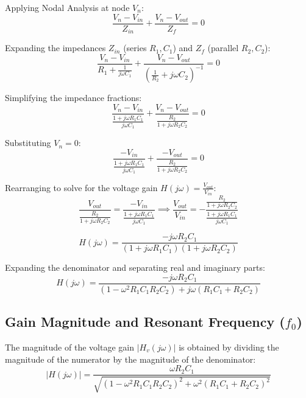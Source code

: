 \documentclass[12pt]{article}
\begin{document}
Applying Nodal Analysis at node $V_n$:
\begin{equation}
    \frac{V_n - V_{in}}{Z_{in}} + \frac{V_n - V_{out}}{Z_f} = 0
\end{equation}

Expanding the impedances $Z_{in}$ (series $R_1, C_1$) and $Z_f$ (parallel $R_2, C_2$):
\begin{equation}
    \frac{V_n - V_{in}}{R_1 + \frac{1}{j\omega C_1}} + \frac{V_n - V_{out}}{\left(\frac{1}{R_2} + j\omega C_2\right)^{-1}} = 0
\end{equation}

Simplifying the impedance fractions:
\begin{equation}
    \frac{V_n - V_{in}}{\frac{1 + j\omega R_1C_1}{j\omega C_1}} + \frac{V_n - V_{out}}{\frac{R_2}{1 + j\omega R_2C_2}} = 0
\end{equation}

Substituting $V_n = 0$:
\begin{equation}
    \frac{-V_{in}}{\frac{1 + j\omega R_1C_1}{j\omega C_1}} + \frac{-V_{out}}{\frac{R_2}{1 + j\omega R_2C_2}} = 0
\end{equation}

Rearranging to solve for the voltage gain $H(j\omega) = \frac{V_{out}}{V_{in}}$:
\begin{equation}
    \frac{V_{out}}{\frac{R_2}{1 + j\omega R_2C_2}} = \frac{-V_{in}}{\frac{1 + j\omega R_1C_1}{j\omega C_1}} \implies \frac{V_{out}}{V_{in}} = - \frac{\frac{R_2}{1 + j\omega R_2C_2}}{\frac{1 + j\omega R_1C_1}{j\omega C_1}}
\end{equation}

\begin{equation}
    H(j\omega) = \frac{-j\omega R_2C_1}{(1 + j\omega R_1C_1)(1 + j\omega R_2C_2)}
\end{equation}

Expanding the denominator and separating real and imaginary parts:
\begin{equation}
    H(j\omega) = \frac{-j\omega R_2C_1}{(1 - \omega^2 R_1C_1 R_2C_2) + j\omega(R_1C_1 + R_2C_2)}
\end{equation}

\subsection*{Gain Magnitude and Resonant Frequency ($f_0$)}
The magnitude of the voltage gain $|H_v(j\omega)|$ is obtained by dividing the magnitude of the numerator by the magnitude of the denominator:
\begin{equation}
    |H(j\omega)| = \frac{\omega R_2C_1}{\sqrt{(1 - \omega^2 R_1C_1 R_2C_2)^2 + \omega^2(R_1C_1 + R_2C_2)^2}}
\end{equation}
\end{document}
